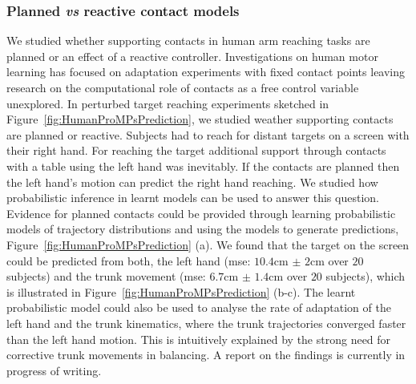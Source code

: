\documentclass[final,5p,twocolumn]{elsarticle}
\begin{document}
\subsubsection{Planned \textit{vs} reactive contact models}
We studied whether supporting contacts in human arm reaching tasks are planned or an effect of a reactive controller. Investigations on human motor learning has focused on adaptation experiments with fixed contact points leaving research on the computational role of contacts as a free control variable unexplored. In perturbed target reaching experiments sketched in Figure~\ref{fig:HumanProMPsPrediction}, we studied weather supporting contacts are planned or reactive. Subjects had to reach for distant targets on a screen with their right hand. For reaching the target additional support through contacts with a table using the left hand was inevitably. If the contacts are planned then the left hand's motion can predict the right hand reaching. We studied how probabilistic inference in learnt models can be used to answer this question. Evidence for planned contacts could be provided through learning probabilistic models of trajectory distributions and using the models to generate predictions, Figure~\ref{fig:HumanProMPsPrediction} (a). We found that the target on the screen could be predicted from both, the left hand (mse: $10.4$cm $\pm$ $2$cm over $20$ subjects) and the trunk movement (mse: $6.7$cm $\pm$ $1.4$cm over $20$ subjects), which is illustrated in Figure~\ref{fig:HumanProMPsPrediction} (b-c). The learnt probabilistic model could also be used to analyse the rate of adaptation of the left hand and the trunk kinematics, where the trunk trajectories converged faster than the left hand motion. This is intuitively explained by the strong need for corrective trunk movements in balancing. A report on the findings is currently in progress of writing.


\end{document}
